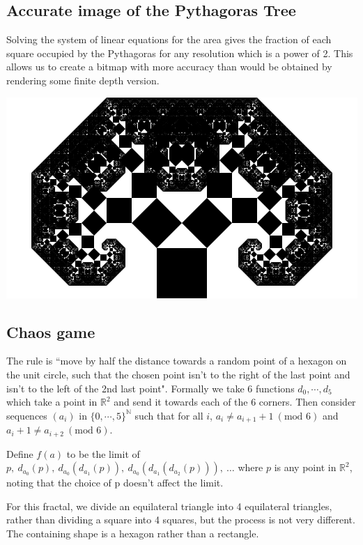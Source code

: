 \documentclass{article}
\begin{document}
\subsection{Accurate image of the Pythagoras Tree}
Solving the system of linear equations for the area gives the fraction of each square occupied by the Pythagoras for any resolution which is a power of 2. This allows us to create a bitmap with more accuracy than would be obtained by rendering some finite depth version.

\includegraphics[width=\linewidth]{x7.png}

\label{sec:chaos}
\subsection{Chaos game}

The rule is ``move by half the distance towards a random point of a hexagon on the unit circle, such that the chosen point isn't to the right of the last point and isn't to the left of the 2nd last point". Formally we take 6 functions $d_0,\cdots, d_5$ which take a point in $\mathbb{R}^2$ and send it towards each of the 6 corners. Then consider sequences $(a_i)$ in $\{0,\cdots,5\}^\mathbb{N}$ such that for all $i$, $a_i\ne a_{i+1}+1\ (\textrm{mod }6)$ and $a_i+1\ne a_{i+2}\ (\textrm{mod }6)$. 

Define $f(a)$ to be the limit of $p,\ d_{a_0}(p),\ d_{a_0}(d_{a_1}(p)),\ d_{a_0}(d_{a_1}(d_{a_2}(p))),\ \dots$ where $p$ is any point in $\mathbb{R}^2$, noting that the choice of p doesn't affect the limit.

For this fractal, we divide an equilateral triangle into 4 equilateral triangles, rather than dividing a square into 4 squares, but the process is not very different. The containing shape is a hexagon rather than a rectangle. 
\end{document}
